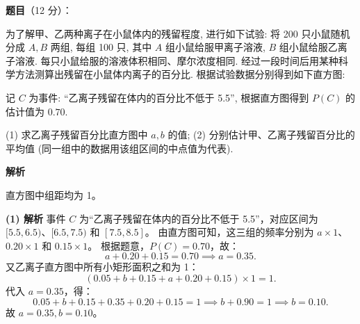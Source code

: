 \begin{answer}

\textbf{题目}（12 分）：

为了解甲、乙两种离子在小鼠体内的残留程度, 进行如下试验: 将 200 只小鼠随机分成 $A, B$ 两组, 每组 100 只, 其中 $A$ 组小鼠给服甲离子溶液, $B$ 组小鼠给服乙离子溶液. 每只小鼠给服的溶液体积相同、摩尔浓度相同. 经过一段时间后用某种科学方法测算出残留在小鼠体内离子的百分比. 根据试验数据分别得到如下直方图:
\nopagebreak[4]
\begin{center}\end{center}
\nopagebreak[4]
记 $C$ 为事件: “乙离子残留在体内的百分比不低于 5.5”, 根据直方图得到 $P(C)$ 的估计值为 $0.70$.

(1) 求乙离子残留百分比直方图中 $a, b$ 的值;  
(2) 分别估计甲、乙离子残留百分比的平均值 (同一组中的数据用该组区间的中点值为代表).

\textbf{解析}

直方图中组距均为 1。

\textbf{(1) 解析}
事件 $C$ 为“乙离子残留在体内的百分比不低于 5.5”，对应区间为 $[5.5, 6.5)$、$[6.5, 7.5)$ 和 $[7.5, 8.5]$。
由直方图可知，这三组的频率分别为 $a \times 1$、$0.20 \times 1$ 和 $0.15 \times 1$。
根据题意，$P(C) = 0.70$，故：
\nopagebreak[4]
\[a + 0.20 + 0.15 = 0.70 \implies a = 0.35.\]
又乙离子直方图中所有小矩形面积之和为 1：
\nopagebreak[4]
\[(0.05 + b + 0.15 + a + 0.20 + 0.15) \times 1 = 1.\]
代入 $a = 0.35$，得：
\nopagebreak[4]
\[0.05 + b + 0.15 + 0.35 + 0.20 + 0.15 = 1 \implies b + 0.90 = 1 \implies b = 0.10.\]
故 $a = 0.35, b = 0.10$。


\end{answer}
